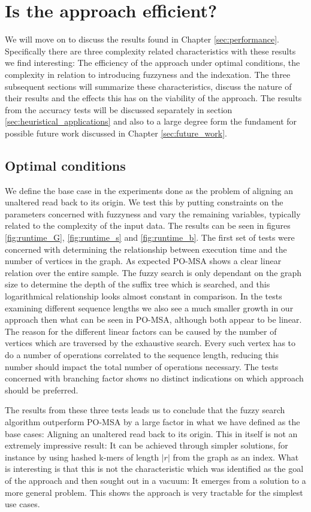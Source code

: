 \documentclass[thesis.tex]{subfiles}
\begin{document}
\section{Is the approach efficient?}
We will move on to discuss the results found in Chapter \ref{sec:performance}. Specifically there are three complexity related characteristics with these results we find interesting: The efficiency of the approach under optimal conditions, the complexity in relation to introducing fuzzyness and the indexation. The three subsequent sections will summarize these characteristics, discuss the nature of their results and the effects this has on the viability of the approach. The results from the accuracy tests will be discussed separately in section \ref{sec:heuristical_applications} and also to a large degree form the fundament for possible future work discussed in Chapter \ref{sec:future_work}.
\subsection*{Optimal conditions}
We define the base case in the experiments done as the problem of aligning an unaltered read back to its origin. We test this by putting constraints on the parameters concerned with fuzzyness and vary the remaining variables, typically related to the complexity of the input data. The results can be seen in figures \ref{fig:runtime_G}, \ref{fig:runtime_s} and \ref{fig:runtime_b}. The first set of tests were concerned with determining the relationship between execution time and the number of vertices in the graph. As expected PO-MSA shows a clear linear relation over the entire sample. The fuzzy search is only dependant on the graph size to determine the depth of the suffix tree which is searched, and this logarithmical relationship looks almost constant in comparison. In the tests examining different sequence lengths we also see a much smaller growth in our approach then what can be seen in PO-MSA, although both appear to be linear. The reason for the different linear factors can be caused by the number of vertices which are traversed by the exhaustive search. Every such vertex has to do a number of operations correlated to the sequence length, reducing this number should impact the total number of operations necessary. The tests concerned with branching factor shows no distinct indications on which approach should be preferred.\\
\par\noindent
The results from these three tests leads us to conclude that the fuzzy search algorithm outperform PO-MSA by a large factor in what we have defined as the base cases: Aligning an unaltered read back to its origin. This in itself is not an extremely impressive result: It can be achieved through simpler solutions, for instance by using hashed k-mers of length $|r|$ from the graph as an index. What is interesting is that this is not the characteristic which was identified as the goal of the approach and then sought out in a vacuum: It emerges from a solution to a more general problem. This shows the approach is very tractable for the simplest use cases.
\end{document}
